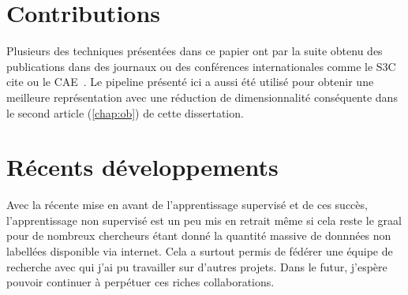 \section{Contributions}

Plusieurs des techniques pr\'{e}sent\'{e}es dans ce papier ont par la suite
obtenu des publications dans des journaux ou des conf\'{e}rences
internationales comme le S3C~\citep{Courville+al-2011} cite ou le
CAE~\citep{Rifai+al-2011}. Le pipeline pr\'{e}sent\'{e} ici a aussi \'{e}t\'{e}
utilis\'{e} pour obtenir une meilleure repr\'{e}sentation avec une
r\'{e}duction de dimensionnalit\'{e} cons\'{e}quente dans le second article
(\ref{chap:ob}) de cette dissertation. 

\section{R\'{e}cents d\'{e}veloppements}

Avec la r\'{e}cente mise en avant de l'apprentissage supervis\'{e} et de ces
succ\`{e}s, l'apprentissage non supervis\'{e} est un peu mis en retrait
m\^{e}me si cela reste le graal pour de nombreux chercheurs \'{e}tant donn\'{e}
la quantit\'{e} massive de donnn\'{e}es non labell\'{e}es disponible via
internet. Cela a surtout permis de f\'{e}d\'{e}rer une \'{e}quipe de recherche
avec qui j'ai pu travailler sur d'autres projets. Dans le futur, j'esp\`{e}re
pouvoir continuer \`{a} perp\'{e}tuer ces riches collaborations.
